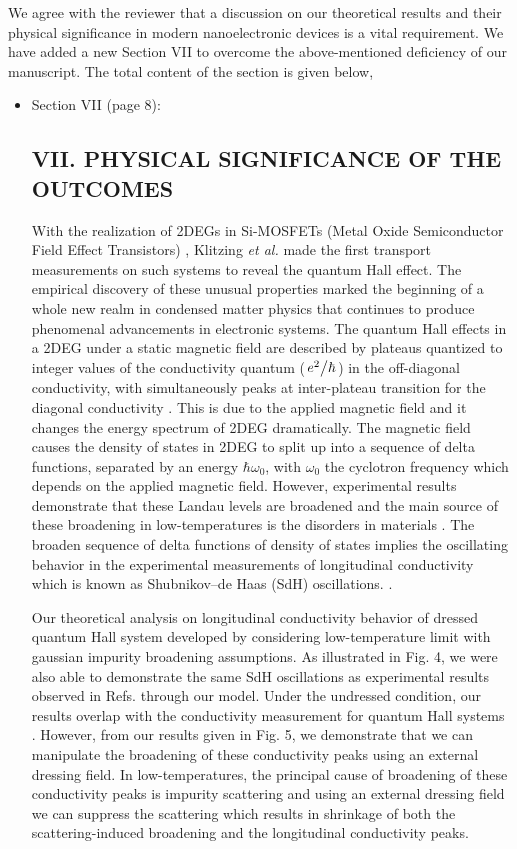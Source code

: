 \documentclass{article}
\begin{document}
We agree with the reviewer that a discussion on our theoretical results and their physical significance in modern nanoelectronic devices is a vital requirement. We have added a new Section VII to overcome the above-mentioned deficiency of our manuscript. The total content of the section is given below,

\begin{itemize}
  \item Section VII (page 8):\\
  {\color{Red}
  \subsection*{VII. PHYSICAL SIGNIFICANCE OF THE OUTCOMES}

  With the realization of 2DEGs in Si-MOSFETs (Metal Oxide Semiconductor Field Effect Transistors) \cite{fowler66}, Klitzing \textit{et al.} \cite{klitzing80} made the first transport measurements on such systems to reveal the quantum Hall effect. The empirical discovery of these unusual properties marked the beginning of a whole new realm in condensed matter physics that continues to produce phenomenal advancements in electronic systems. The quantum Hall effects in a 2DEG under a static magnetic field are described by plateaus quantized to integer values of the conductivity quantum ($\flatfrac{e^2}{\hbar}$) in the off-diagonal conductivity, with simultaneously peaks at inter-plateau transition for the diagonal conductivity \cite{endo09}. This is due to the applied magnetic field and it changes the energy spectrum of 2DEG dramatically. The magnetic field causes the density of states in 2DEG to split up into a sequence of delta functions, separated by an energy $\hbar\omega_0$, with $\omega_0$ the cyclotron frequency which depends on the applied magnetic field.
  However, experimental results demonstrate that these Landau levels are broadened and the main source of these broadening in low-temperatures is the disorders in materials \cite{ando85,dial07}. The broaden sequence of delta functions of density of states implies the oscillating behavior in the experimental measurements of longitudinal conductivity which is known as Shubnikov–de Haas (SdH) oscillations. \cite{endo09,wakabayashi78}.

  Our theoretical analysis on longitudinal conductivity behavior of dressed quantum Hall system developed by considering low-temperature limit with gaussian impurity broadening assumptions. As illustrated in Fig. 4, we were also able to demonstrate the same SdH oscillations as experimental results observed in Refs. \cite{endo09,wakabayashi78} through our model. Under the undressed condition, our results overlap with the conductivity measurement for quantum Hall systems \cite{endo09}. However, from our results given in Fig. 5, we demonstrate that we can manipulate the broadening of these conductivity peaks using an external dressing field. In low-temperatures, the principal cause of broadening of these conductivity peaks is impurity scattering and using an external dressing field we can suppress the scattering which results in shrinkage of both the scattering-induced broadening and the longitudinal conductivity peaks.

}
\end{itemize}
\end{document}
